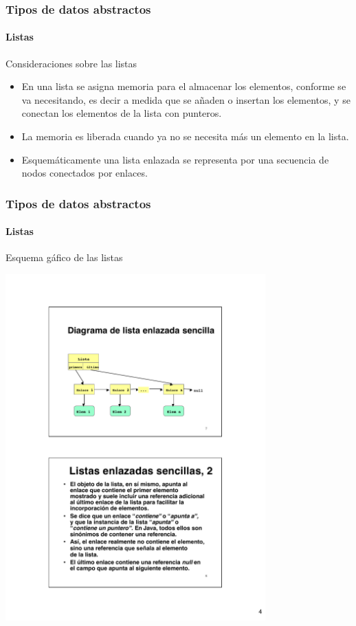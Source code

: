 \documentclass{beamer}
\begin{document}
		\begin{frame}
			\frametitle{Tipos de datos abstractos}
			\framesubtitle{Listas}

			\begin{block}{Consideraciones sobre las listas}
				\begin{itemize}
					\item En una lista se asigna memoria para el almacenar los elementos, conforme se va necesitando, es decir a medida que se a\~naden o insertan los elementos, y se conectan los elementos de la lista con punteros.
					\item La memoria es liberada cuando ya no se necesita m\'as un elemento en la lista.
					\item Esquem\'aticamente una lista enlazada se representa por una secuencia de nodos conectados por enlaces.
				\end{itemize}
			\end{block}
		\end{frame}

		\begin{frame}
			\frametitle{Tipos de datos abstractos}
			\framesubtitle{Listas}

			\begin{block}{Esquema g\'afico de las listas}
				\begin{center}
					\includegraphics[width=10cm]{images/esquema.pdf}
				\end{center}
			\end{block}
		\end{frame}
\end{document}
